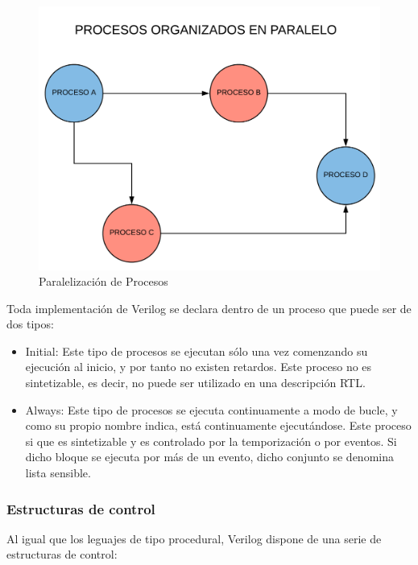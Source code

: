 \begin{center}
	\begin{figure}[H]
		\center
		\includegraphics[trim = 0mm 0mm 0mm 0mm, clip,scale=0.3]{imagenes/EstadoArte/procesos_paralelo.pdf}
		\caption{Paralelización de Procesos}
		\label{fig:procesos_paralelo}
	\end{figure}
	
\end{center}
Toda implementación de Verilog se declara dentro de un proceso que puede ser de dos tipos:

\begin{itemize}
		\item Initial: Este tipo de procesos se ejecutan sólo una vez comenzando su ejecución al inicio, y por tanto no existen retardos. Este proceso no es sintetizable, es decir, no puede ser utilizado en una descripción RTL.
		
		\item Always: Este tipo de procesos se ejecuta continuamente a modo de bucle, y como su propio nombre indica, está continuamente ejecutándose. Este proceso si que es sintetizable y es controlado por la temporización o por eventos. Si dicho bloque se ejecuta por más de un evento, dicho conjunto se denomina lista sensible.
\end{itemize}

\subsubsection{Estructuras de control}

Al igual que los leguajes de tipo procedural, Verilog dispone de una serie de estructuras de control:

